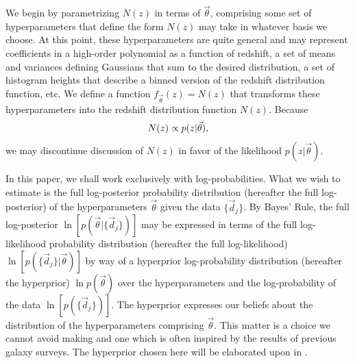 
We begin by parametrizing $N(z)$ in terms of $\vec{\theta}$, comprising some set of hyperparameters that define the form $N(z)$ may take in whatever basis we choose.  
At this point, these hyperparameters are quite general and may represent coefficients in a high-order polynomial as a function of redshift, a set of means and variances defining Gaussians that sum to the desired distribution, a set of histogram heights that describe a binned version of the redshift distribution function, etc.  
We define a function $f_{\vec{\theta}}(z)=N(z)$ that transforms these hyperparameters into the redshift distribution function $N(z)$.  
Because 
\begin{equation}
\eqlabel{eq:definition}
N(z)\propto p(z|\vec{\theta}),
\end{equation}
we may discontinue discussion of $N(z)$ in favor of the likelihood $p(z|\vec{\theta})$.

In this paper, we shall work exclusively with log-probabilities.  
What we wish to estimate is the full log-posterior probability distribution (hereafter the full log-posterior) of the hyperparameters $\vec{\theta}$ given the data $\{\vec{d}_{j}\}$.  
By Bayes' Rule, the full log-posterior $\ln[p(\vec{\theta}|\{\vec{d}_{j}\})]$ may be expressed in terms of the full log-likelihood probability distribution (hereafter the full log-likelihood) $\ln[p(\{\vec{d}_{j}\}|\vec{\theta})]$ by way of a hyperprior log-probability distribution (hereafter the hyperprior) $\ln p(\vec{\theta})$ over the hyperparameters and the log-probability of the data $\ln[p(\{\vec{d}_{j}\})]$.  
The hyperprior expresses our beliefs about the distribution of the hyperparameters comprising $\vec{\theta}$.  
This matter is a choice we cannot avoid making and one which is often inspired by the results of previous galaxy surveys.  
The hyperprior chosen here will be elaborated upon in .

